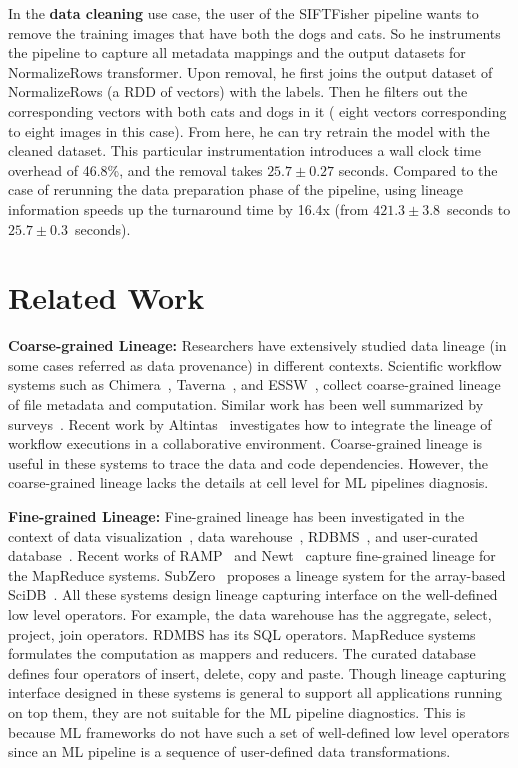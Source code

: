 \documentclass{sig-alternate}
\begin{document}
In the {\bf data cleaning} use case, the user of the SIFTFisher pipeline wants to remove the training images that have both the dogs and cats.
So he instruments the pipeline to capture all metadata mappings and the output datasets for NormalizeRows transformer. 
Upon removal, he first joins the output dataset of NormalizeRows (a RDD of vectors) with the labels.
Then he filters out the corresponding vectors with both cats and dogs in it ( eight vectors corresponding to eight images in this case). 
From here, he can try retrain the model with the cleaned dataset. 
This particular instrumentation introduces a wall clock time overhead of 46.8\%, and the removal takes $25.7\pm0.27$ seconds.
Compared to the case of rerunning the data preparation phase of the pipeline, using lineage information speeds up the turnaround
time by 16.4x (from $421.3\pm3.8$~seconds to $25.7\pm0.3$~seconds). 


\section{Related Work}
\label{sec:Related}
{\bf Coarse-grained Lineage:} Researchers have extensively studied data lineage (in some cases referred as data provenance) in different contexts.
Scientific workflow systems such as  Chimera~\cite{foster02}, Taverna~\cite{oinn02}, and ESSW~\cite{frew01}, 
collect coarse-grained lineage of file metadata and computation. 
Similar work has been well summarized by surveys~\cite{simmhan05, freire08, bose05}.
Recent work by Altintas~\cite{altintas10} investigates how to integrate the lineage of workflow executions
in a collaborative environment. Coarse-grained lineage is useful in these systems to trace the data and code dependencies.
However, the coarse-grained lineage lacks the details at cell level for ML pipelines diagnosis.

{\bf Fine-grained Lineage:} Fine-grained lineage has been investigated in the context of data visualization~\cite{stonebraker93, woodruff97},  
data warehouse~\cite{cui00, cui03}, RDBMS~\cite{widom04}, and user-curated database~\cite{buneman06}.
Recent works of RAMP~\cite{ikeda11, park11} and Newt~\cite{logothetis13} capture fine-grained lineage for the MapReduce
systems. SubZero~\cite{wu13} proposes a lineage system for the array-based SciDB~\cite{brown10}.
All these systems design lineage capturing interface on the well-defined low level operators.
For example, the data warehouse has the aggregate, select, project, join operators. 
RDMBS has its SQL operators. MapReduce systems formulates the computation as mappers and reducers.
The curated database defines four operators of insert, delete, copy and paste.
Though lineage capturing interface designed in these systems is general to support all applications running on top them,
they are not suitable for the ML pipeline diagnostics.
This is because ML frameworks do not have such a set of well-defined low level operators since an ML pipeline is a sequence of user-defined 
data transformations.
\end{document}
